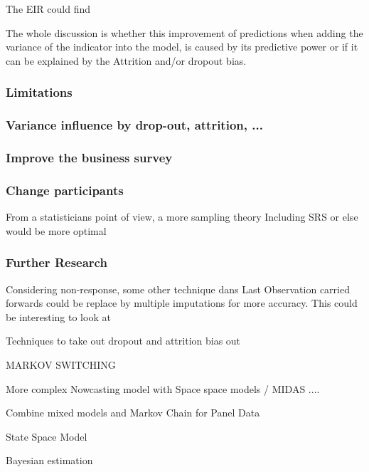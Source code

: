 \documentclass[12pt,a4paper,oneside]{book}
\begin{document}
The EIR could find 



The whole discussion is whether this improvement of predictions when adding the variance of the indicator into the model, is caused by its predictive power or if it can be explained by the Attrition and/or dropout bias.

\subsubsection{Limitations}

\subsubsection{Variance influence by drop-out, attrition, ...}

\subsubsection{Improve the business survey}




\subsubsection{Change participants}

From a statisticians point of view, a more sampling theory Including SRS or else would be more optimal


\subsubsection{Further Research}


Considering non-response, some other technique dans Last Observation carried forwards could be replace by multiple imputations for more accuracy. This could be interesting to look at

Techniques to take out dropout and attrition bias out

MARKOV SWITCHING


More complex Nowcasting model with Space space models / MIDAS ....

Combine mixed models and Markov Chain for Panel Data \citep{de_haan-rietdijk_use_2017} 

State Space Model

Bayesian estimation \cite{bialowolski_bayesian_nodate}

\nocite{hlavac_stargazer:_2018}


 
\end{document}
